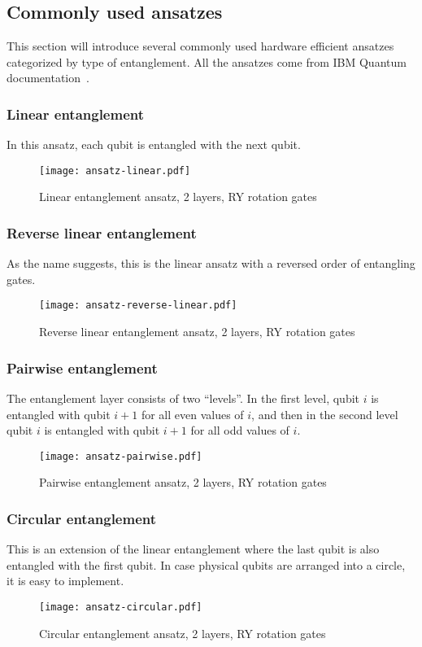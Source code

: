 \subsection{Commonly used ansatzes}\label{sec:ansatzes}
This section will introduce several commonly used hardware efficient ansatzes categorized by type of entanglement. All the ansatzes come from IBM Quantum documentation~\cite{twolocal}. 

\subsubsection{Linear entanglement}
In this ansatz, each qubit is entangled with the next qubit. 
\begin{figure}[H]
    \centering
    \texttt{[image: ansatz-linear.pdf]}
    \caption{Linear entanglement ansatz, 2 layers, RY rotation gates}
\end{figure}
\subsubsection{Reverse linear entanglement}
As the name suggests, this is the linear ansatz with a reversed order of entangling gates.
\begin{figure}[H]
    \centering
    \texttt{[image: ansatz-reverse-linear.pdf]}
    \caption{Reverse linear entanglement ansatz, 2 layers, RY rotation gates}
\end{figure}

\subsubsection{Pairwise entanglement}
The entanglement layer consists of two ``levels''. In the first level, qubit $i$ is entangled with qubit $i+1$ for all even values of $i$, and then in the second level qubit $i$ is entangled with qubit $i+1$ for all odd values of $i$. 
\begin{figure}[H]
    \centering
    \texttt{[image: ansatz-pairwise.pdf]}
    \caption{Pairwise entanglement ansatz, 2 layers, RY rotation gates}
\end{figure}

\subsubsection{Circular entanglement}
This is an extension of the linear entanglement where the last qubit is also entangled with the first qubit. In case physical qubits are arranged into a circle, it is easy to implement.
\begin{figure}[H]
    \centering
    \texttt{[image: ansatz-circular.pdf]}
    \caption{Circular entanglement ansatz, 2 layers, RY rotation gates}
\end{figure}

